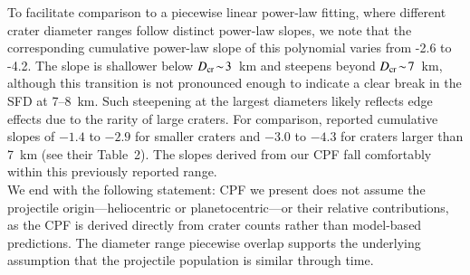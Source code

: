 \documentclass[preprint,11pt,3p,times,authoryear]{elsarticle}
\begin{document}
{%

To facilitate comparison to a piecewise linear power-law fitting, where different crater diameter ranges follow distinct power-law slopes, we note that the corresponding cumulative power-law slope of this polynomial varies from -2.6 to -4.2.
The slope is shallower below $D_{\rm cr}\!\sim\!3$~km and steepens beyond $D_{\rm cr}\!\sim\!7$~km, although this transition is not pronounced enough to indicate a clear break in the SFD at 7--8~km. Such steepening at the largest diameters likely reflects edge effects due to the rarity of large craters.
For comparison, \citet{Kirchoff2009} reported cumulative slopes of $-1.4$ to $-2.9$
for smaller craters and $-3.0$ to $-4.3$ for craters larger than 7~km (see their Table~2). The slopes derived from our CPF fall comfortably within this previously reported range.\\

We end with the following statement: CPF we present does not assume the projectile origin—heliocentric or planetocentric—or their relative contributions, as the CPF is derived directly from crater counts rather than model-based predictions. The diameter range piecewise overlap supports the underlying assumption that the projectile population is similar through time.



}
\end{document}
